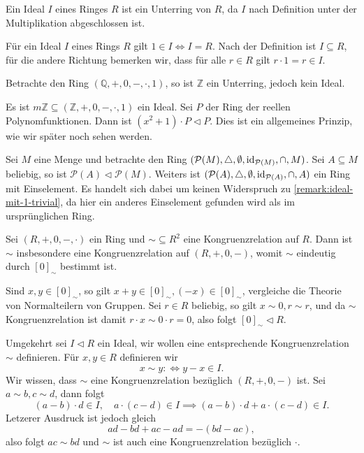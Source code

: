 \begin{remark}
    Ein Ideal $I$ eines Ringes $R$ ist ein Unterring von $R$, da $I$ nach Definition unter der Multiplikation abgeschlossen ist.
\end{remark}

\begin{remark}\label{remark:ideal-mit-1-trivial}
    Für ein Ideal $I$ eines Rings $R$ gilt $1 \in I \Leftrightarrow I = R$. Nach der Definition ist $I \subseteq R$, für die andere Richtung bemerken wir, dass für alle $r \in R$ gilt $r \cdot 1 = r \in I$.
\end{remark}

\begin{example}
    Betrachte den Ring $(\mathbb{Q}, +, 0, -, \cdot, 1)$, so ist $\mathbb{Z}$ ein Unterring, jedoch kein Ideal.
\end{example}

\begin{example}
    Es ist $m \mathbb{Z} \subseteq (\mathbb{Z}, +, 0, -, \cdot, 1)$ ein Ideal. Sei $P$ der Ring der reellen Polynomfunktionen. Dann ist $(x^2 + 1) \cdot P \vartriangleleft P$. Dies ist ein allgemeines Prinzip, wie wir später noch sehen werden.

    Sei $M$ eine Menge und betrachte den Ring $(\mathcal{P}(M), \triangle, \emptyset, \operatorname{id}_{\mathcal{P}(M)}, \cap, M)$. Sei $A \subseteq M$ beliebig, so ist $\mathcal{P}(A) \vartriangleleft \mathcal{P}(M)$. Weiters ist $(\mathcal{P}(A), \triangle, \emptyset, \operatorname{id}_{\mathcal{P}(A)}, \cap, A)$ ein Ring mit Einselement. Es handelt sich dabei um keinen Widerspruch zu \cref{remark:ideal-mit-1-trivial}, da hier ein anderes Einselement gefunden wird als im ursprünglichen Ring.
\end{example}

\begin{remark}\label{remark:ideal-congrel}
    Sei $(R, +, 0, -, \cdot)$ ein Ring und $\sim \subseteq R^2$ eine Kongruenzrelation auf $R$. Dann ist $\sim$ insbesondere eine Kongruenzrelation auf $(R, +, 0, -)$, womit $\sim$ eindeutig durch $[0]_{\sim}$ bestimmt ist.

    Sind $x, y \in [0]_{\sim}$, so gilt $x + y \in [0]_{\sim}, (-x) \in [0]_{\sim}$, vergleiche die Theorie von Normalteilern von Gruppen. Sei $r \in R$ beliebig, so gilt $x \sim 0, r \sim r$, und da $\sim$ Kongruenzrelation ist damit $r \cdot x \sim 0 \cdot r = 0$, also folgt $[0]_{\sim} \vartriangleleft R$.

    Umgekehrt sei $I \vartriangleleft R$ ein Ideal, wir wollen eine entsprechende Kongruenzrelation $\sim$ definieren. Für $x, y \in R$ definieren wir
    $$ x \sim y :\Leftrightarrow y - x \in I. $$
    Wir wissen, dass $\sim$ eine Kongruenzrelation bezüglich $(R, +, 0, -)$ ist. Sei $a \sim b, c \sim d$, dann folgt
    $$ (a-b) \cdot d \in I, \quad a \cdot (c - d) \in I \implies (a-b)\cdot d + a\cdot(c-d) \in I. $$
    Letzerer Ausdruck ist jedoch gleich
    $$ ad - bd + ac - ad = -(bd - ac), $$
    also folgt $ac \sim bd$ und $\sim$ ist auch eine Kongruenzrelation bezüglich $\cdot$.
\end{remark}

